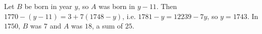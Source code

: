 Let $B$ be born in year $y$, so $A$ was born in $y-11$. Then $1770-(y-11)=3+7(1748-y)$, i.e. $1781-y=12239-7y$, so $y=1743$. In $1750$, $B$ was $7$ and $A$ was $18$, a sum of $\boxed{25}$.
